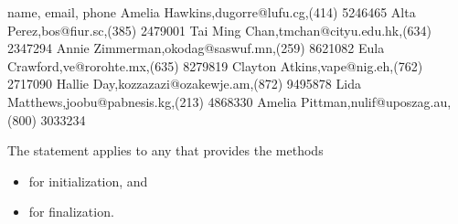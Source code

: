 \documentclass[letterpaper,10pt,english]{sphinxmanual}
\begin{document}
\begin{sphinxVerbatim}[commandchars=\\\{\}]
   
\end{sphinxVerbatim}

\begin{sphinxVerbatim}[commandchars=\\\{\}]
name, email, phone
Amelia Hawkins,dugorre@lufu.cg,(414) 524\PYGZhy{}6465
Alta Perez,bos@fiur.sc,(385) 247\PYGZhy{}9001
Tai Ming Chan,tmchan@cityu.edu.hk,(634) 234\PYGZhy{}7294
Annie Zimmerman,okodag@saswuf.mn,(259) 862\PYGZhy{}1082
Eula Crawford,ve@rorohte.mx,(635) 827\PYGZhy{}9819
Clayton Atkins,vape@nig.eh,(762) 271\PYGZhy{}7090
Hallie Day,kozzazazi@ozakewje.am,(872) 949\PYGZhy{}5878
Lida Matthews,joobu@pabnesis.kg,(213) 486\PYGZhy{}8330
Amelia Pittman,nulif@uposzag.au,(800) 303\PYGZhy{}3234
\end{sphinxVerbatim}

The  statement applies to any  that provides the methods
\begin{itemize}
\item {} 
 for initialization, and

\item {} 
 for finalization.

\end{itemize}

\begin{sphinxVerbatim}[commandchars=\\\{\}]
   
         
\end{sphinxVerbatim}
\end{document}
